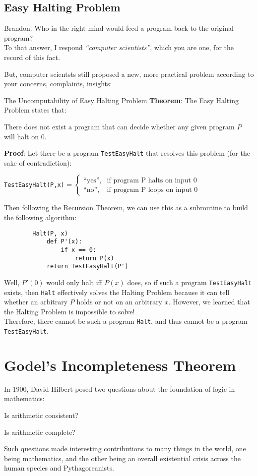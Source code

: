 \subsection{Easy Halting Problem}
Brandon. Who in the right mind would feed a program back to the original program? \\
To that answer, I respond \textit{``computer scientists''}, which you are one, for the record of this fact.

But, computer scientsts still proposed a new, more practical problem according to your concerns, complaints, insights:
\begin{ln-theorem}{The Uncomputability of Easy Halting Problem}{}
    \textbf{Theorem}: The Easy Halting Problem states that:
    \begin{center}
        There does not exist a program that can decide whether any given program $P$ will halt on $0$.
    \end{center}
    \tcblower
    \textbf{Proof}: Let there be a program \verb+TestEasyHalt+ that resolves this problem (for the sake of contradiction):
    \begin{center}
        \verb+TestEasyHalt(P,x)+ = $
        \begin{cases}
            \text{``yes''}, &\text{if program P halts on input 0} \\
            \text{``no''}, &\text{if program P loops on input 0}
        \end{cases} $
    \end{center}
    Then following the Recursion Theorem, we can use this as a subroutine to build the following algorithm:
    \begin{verbatim}
        Halt(P, x)
            def P'(x):
                if x == 0:
                    return P(x)
            return TestEasyHalt(P')
    \end{verbatim}
    Well, $P'(0)$ would only halt iff $P(x)$ does, so if such a program \verb+TestEasyHalt+ exists, then \verb+Halt+ effectively solves the Halting Problem because it can tell whether an arbitrary $P$ holds or not on an arbitrary $x$. However, we learned that the Halting Problem is impossible to solve! \\
    Therefore, there cannot be such a program \verb+Halt+, and thus cannot be a program \verb+TestEasyHalt+.
\end{ln-theorem}

\section{Godel's Incompleteness Theorem}
In 1900, David Hilbert posed two questions about the foundation of logic in mathematics:
\begin{bindenum}
    \item Is arithmetic consistent?
    \item Is arithmetic complete?
\end{bindenum}
Such questions made interesting contributions to many things in the world, one being mathematics, and the other being an overall existential crisis across the human species and Pythagoreanists.

